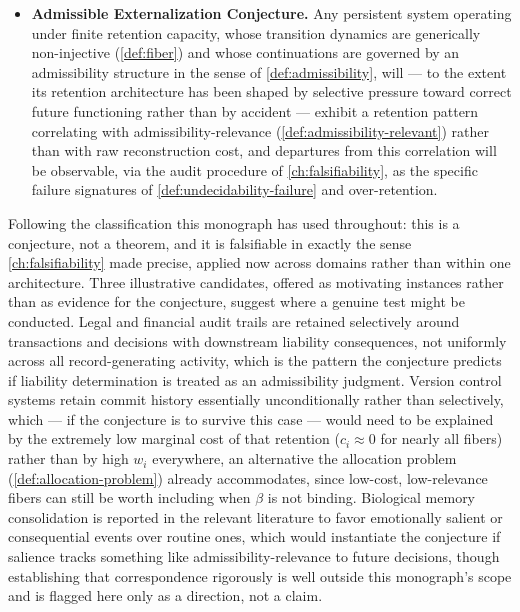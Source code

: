 \documentclass[11pt]{book}
\theoremstyle{plain}
\theoremstyle{definition}
\theoremstyle{remark}
\begin{document}
\begin{itemize}
\item[] \textbf{Admissible Externalization Conjecture.} Any persistent
system operating under finite retention capacity, whose transition
dynamics are generically non-injective
(\cref{def:fiber}) and whose continuations are governed by an
admissibility structure in the sense of \cref{def:admissibility}, will
--- to the extent its retention architecture has been shaped by
selective pressure toward correct future functioning rather than by
accident --- exhibit a retention pattern correlating with
admissibility-relevance (\cref{def:admissibility-relevant}) rather
than with raw reconstruction cost, and departures from this
correlation will be observable, via the audit procedure of
\cref{ch:falsifiability}, as the specific failure signatures of
\cref{def:undecidability-failure} and over-retention.
\end{itemize}

Following the classification this monograph has used throughout: this
is a conjecture, not a theorem, and it is falsifiable in exactly the
sense \cref{ch:falsifiability} made precise, applied now across
domains rather than within one architecture. Three illustrative
candidates, offered as motivating instances rather than as evidence
for the conjecture, suggest where a genuine test might be conducted.
Legal and financial audit trails are retained selectively around
transactions and decisions with downstream liability consequences, not
uniformly across all record-generating activity, which is the pattern
the conjecture predicts if liability determination is treated as an
admissibility judgment. Version control systems retain commit history
essentially unconditionally rather than selectively, which --- if the
conjecture is to survive this case --- would need to be explained by
the extremely low marginal cost of that retention ($c_i \approx 0$ for
nearly all fibers) rather than by high $w_i$ everywhere, an alternative
the allocation problem (\cref{def:allocation-problem}) already
accommodates, since low-cost, low-relevance fibers can still be worth
including when $\beta$ is not binding. Biological memory consolidation
is reported in the relevant literature to favor emotionally salient or
consequential events over routine ones, which would instantiate the
conjecture if salience tracks something like admissibility-relevance
to future decisions, though establishing that correspondence
rigorously is well outside this monograph's scope and is flagged here
only as a direction, not a claim.
\end{document}
